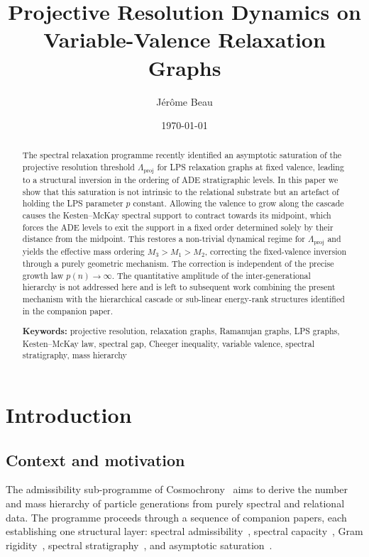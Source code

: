 \documentclass[11pt]{article}
\title{Projective Resolution Dynamics on Variable-Valence Relaxation Graphs}
\author{J\'er\^ome Beau}
\date{\today}
\newcommand{\Lproj}{\Lambda_{\mathrm{proj}}}
\begin{document}
  \maketitle

  \begin{abstract}
    The spectral relaxation programme recently identified an asymptotic saturation
    of the projective resolution threshold $\Lproj$ for LPS relaxation graphs at
    fixed valence, leading to a structural inversion in the ordering of ADE
    stratigraphic levels.
    In this paper we show that this saturation is not intrinsic to the relational
    substrate but an artefact of holding the LPS parameter $p$ constant.
    Allowing the valence to grow along the cascade causes the Kesten--McKay
    spectral support to contract towards its midpoint, which forces the ADE levels
    to exit the support in a fixed order determined solely by their distance from
    the midpoint.
    This restores a non-trivial dynamical regime for $\Lproj$ and yields the
    effective mass ordering $M_3 > M_1 > M_2$, correcting the fixed-valence
    inversion through a purely geometric mechanism.
    The correction is independent of the precise growth law $p(n) \to \infty$.
    The quantitative amplitude of the inter-generational hierarchy is not addressed
    here and is left to subsequent work combining the present mechanism with the
    hierarchical cascade or sub-linear energy-rank structures identified in the
    companion paper.

    \medskip
    \noindent\textbf{Keywords:}
    projective resolution, relaxation graphs, Ramanujan graphs, LPS graphs,
Kesten--McKay law, spectral gap, Cheeger inequality, variable valence,
spectral stratigraphy, mass hierarchy
  \end{abstract}

  \clearpage
  \tableofcontents

  \clearpage
  \section{Introduction}
    \label{sec:intro}

    \subsection{Context and motivation}
      \label{subsec:context}

      The admissibility sub-programme of Cosmochrony~\cite{cosmochrony} aims to
      derive the number and mass hierarchy of
      particle generations from purely spectral and relational data.
      The programme proceeds through a sequence of companion papers, each
      establishing one structural layer: spectral admissibility~\cite{Beau2026a1},
      spectral capacity~\cite{Beau2026a2}, Gram rigidity~\cite{Beau2026a3}, spectral
      stratigraphy~\cite{Beau2026a4}, and asymptotic saturation~\cite{Beau2026a5}.
\end{document}
